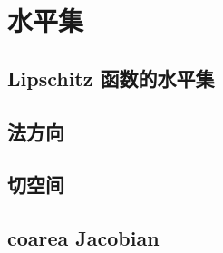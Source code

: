 \section{水平集}
\label{b1:sec:1801}


\subsection{Lipschitz 函数的水平集}
\label{b1:subsec:180101}

\subsection{法方向}
\label{b1:subsec:180102}

\subsection{切空间}
\label{b1:subsec:180103}

\subsection{coarea Jacobian}
\label{b1:subsec:180104}



